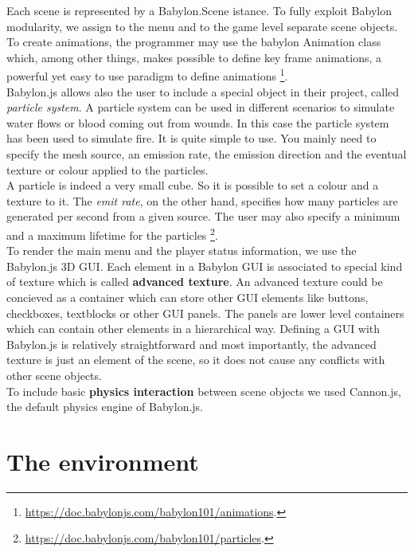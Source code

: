 \documentclass[14pt]{article}
\begin{document}
Each scene is represented by a Babylon.Scene istance. To fully exploit Babylon modularity, we assign to the menu and to the game level separate scene objects.\\
To create animations, the programmer may use the babylon Animation class which, among other things, makes possible to define key frame animations, a powerful yet easy to use paradigm to define animations \footnote{\url{https://doc.babylonjs.com/babylon101/animations}.}. \\
Babylon.js allows also the user to include a special object in their project, called \textit{particle system}. A particle system can be used in different scenarios to simulate water flows or blood coming out from wounds. In this case the particle system has been used to simulate fire. It is quite simple to use. You mainly need to specify the mesh source, an emission rate, the emission direction and the eventual texture or colour applied to the particles.\\
A particle is indeed a very small cube. So it is possible to set a colour and a texture to it. The \textit{emit rate}, on the other hand, specifies how many particles are generated per second from a given source. The user may also specify a minimum and a maximum lifetime for the particles 
\footnote{\url{https://doc.babylonjs.com/babylon101/particles}.}.\\
To render the main menu and the player status information, we use the Babylon.js 3D GUI. Each element in a Babylon GUI is associated to special kind of texture which is called \textbf{ advanced texture}. An advanced texture could be concieved as a container which can store other GUI elements like buttons, checkboxes, textblocks or other GUI panels. The panels are lower level containers which can contain other elements in a hierarchical way. Defining a GUI with Babylon.js is relatively straightforward and most importantly, the advanced texture is just an element of the scene, so it does not cause any conflicts with other scene objects.\\
To include basic \textbf{physics interaction} between scene objects we used Cannon.js, the default physics engine of Babylon.js.

\section{The environment}
\end{document}
